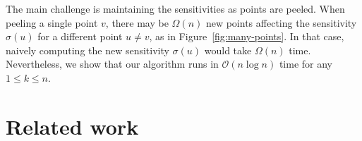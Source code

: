\documentclass{cccg24}
\newcommand{\Oh}[1]{\mathcal{O}\!\lrParents{#1}}
\newcommand{\OhMega}[1]{\Omega\!\lrParents{#1}}
\newcommand{\lrParents}[1]{\left( #1 \right)}
\newcommand{\logn}{\log{n}}
\newcommand{\sens}[1]{\sigma\!\lrParents{#1}}
\begin{document}
The main challenge is maintaining the sensitivities as points are peeled. When peeling a single point $v$, there may be $\OhMega{n}$ new points affecting the sensitivity $\sens{u}$ for a different point $u \neq v$, as in Figure~\ref{fig:many-points}. In that case, naively computing the new sensitivity $\sens{u}$ would take $\OhMega{n}$ time. Nevertheless, we show that our algorithm runs in $\Oh{n \logn}$ time for any $1 \leq k \leq n$.






\section{Related work}


\end{document}
